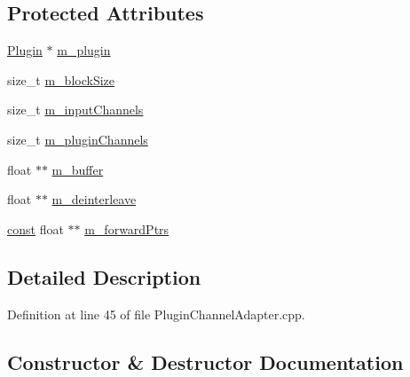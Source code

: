 \subsection*{Protected Attributes}
\begin{DoxyCompactItemize}
\item 
\hyperlink{class_vamp_1_1_plugin}{Plugin} $\ast$ \hyperlink{class_vamp_1_1_host_ext_1_1_plugin_channel_adapter_1_1_impl_aff31c1cf3a0fb18ddab7e3ab213c3c07}{m\+\_\+plugin}
\item 
size\+\_\+t \hyperlink{class_vamp_1_1_host_ext_1_1_plugin_channel_adapter_1_1_impl_abe7b76040411a4544a9a8b0808737626}{m\+\_\+block\+Size}
\item 
size\+\_\+t \hyperlink{class_vamp_1_1_host_ext_1_1_plugin_channel_adapter_1_1_impl_a6e32d1564be175506a4d43dbfb8e3ace}{m\+\_\+input\+Channels}
\item 
size\+\_\+t \hyperlink{class_vamp_1_1_host_ext_1_1_plugin_channel_adapter_1_1_impl_a94268d42f93bd26608fab34d5b4ad680}{m\+\_\+plugin\+Channels}
\item 
float $\ast$$\ast$ \hyperlink{class_vamp_1_1_host_ext_1_1_plugin_channel_adapter_1_1_impl_a0494a5293836baeb822405ec4ce0c553}{m\+\_\+buffer}
\item 
float $\ast$$\ast$ \hyperlink{class_vamp_1_1_host_ext_1_1_plugin_channel_adapter_1_1_impl_aa17014ee0ee07066566a1f2b620113e5}{m\+\_\+deinterleave}
\item 
\hyperlink{getopt1_8c_a2c212835823e3c54a8ab6d95c652660e}{const} float $\ast$$\ast$ \hyperlink{class_vamp_1_1_host_ext_1_1_plugin_channel_adapter_1_1_impl_a882147731ba96cf5da446265dbce11bd}{m\+\_\+forward\+Ptrs}
\end{DoxyCompactItemize}


\subsection{Detailed Description}


Definition at line 45 of file Plugin\+Channel\+Adapter.\+cpp.



\subsection{Constructor \& Destructor Documentation}
